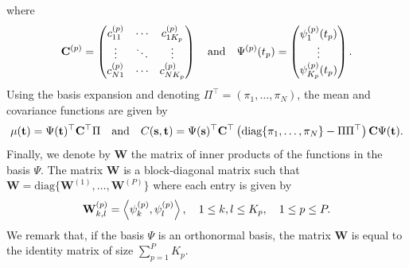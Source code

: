 where
\begin{equation}
\mathbf{C}^{(p)} = \begin{pmatrix}
    c^{(p)}_{11} & \cdots & c^{(p)}_{1K_p} \\
    \vdots & \ddots & \vdots \\
    c^{(p)}_{N1} & \cdots & c^{(p)}_{NK_p}
\end{pmatrix} \\
\quad \text{and}\quad
\Psi^{(p)}(t_p) = \begin{pmatrix}
    \psi_1^{(p)}(t_p) \\
    \vdots \\
    \psi_{K_p}^{(p)}(t_p)
\end{pmatrix}.
\end{equation}
Using the basis expansion and denoting $\Pi^\top = (\pi_1, \dots, \pi_N)$, the mean and covariance functions are given by
\begin{equation}
    \mu(\mathbf{t}) = \Psi(\mathbf{t})^\top \mathbf{C}^\top\Pi \quad\text{and}\quad C(\mathbf{s}, \mathbf{t}) = \Psi(\mathbf{s})^\top \mathbf{C}^\top \left(\text{diag}\{
        \pi_1, \dots, \pi_N\} - \Pi\Pi^\top\right)\mathbf{C} \Psi(\mathbf{t}).
\end{equation}
Finally, we denote by $\mathbf{W}$ the matrix of inner products of the functions in the basis $\Psi$. The matrix $\mathbf{W}$ is a block-diagonal matrix such that $\mathbf{W} = \text{diag}\{\mathbf{W}^{(1)}, \dots, \mathbf{W}^{(P)}\}$ where each entry is given by
\begin{equation}
    \mathbf{W}_{k, l}^{(p)} = \left\langle\psi_k^{(p)}, \psi_l^{(p)}\right\rangle, \quad 1 \leq k, l \leq K_p, \quad 1 \leq p \leq P.
\end{equation}
We remark that, if the basis $\Psi$ is an orthonormal basis, the matrix $\mathbf{W}$ is equal to the identity matrix of size $\sum_{p = 1}^P K_p$.



